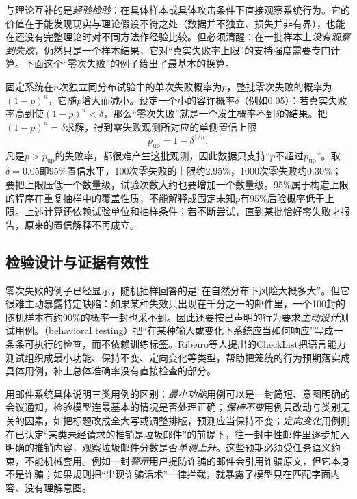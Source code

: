 与理论互补的是\emph{经验检验}：在具体样本或具体攻击条件下直接观察系统行为。它的价值在于能发现现实与理论假设不符之处（数据并不独立、损失并非有界），也能在还没有完整理论时对不同方法作经验比较。但必须清醒：在一批样本上\emph{没有观察到失败}，仍然只是一个样本结果，它对“真实失败率上限”的支持强度需要专门计算。下面这个“零次失败”的例子给出了最基本的换算。

\begin{example}[零次失败的含义]
\label{ex:trust-zero-failures}
固定系统在$n$次独立同分布试验中的单次失败概率为$p$，整批零次失败的概率为$(1-p)^n$，它随$p$增大而减小。设定一个小的容许概率$\delta$（例如0.05）：若真实失败率高到使$(1-p)^n<\delta$，那么“零次失败”就是一个发生概率不到$\delta$的结果。把$(1-p)^n=\delta$求解，得到零失败观测所对应的单侧置信上限
\[
 p_{\mathrm{up}}=1-\delta^{1/n}.
\]
凡是$p>p_{\mathrm{up}}$的失败率，都很难产生这批观测，因此数据只支持“$p$不超过$p_{\mathrm{up}}$”。取$\delta=0.05$即95\%置信水平，100次零失败的上限约2.95\%，1000次零失败约0.30\%；要把上限压低一个数量级，试验次数大约也要增加一个数量级。95\%属于构造上限的程序在重复抽样中的覆盖性质，不能解释成固定未知$p$有95\%后验概率低于上限。上述计算还依赖试验单位和抽样条件；若不断尝试，直到某批恰好零失败才报告，原来的置信解释不再成立。
\end{example}

\subsection{检验设计与证据有效性}

零次失败的例子已经显示，随机抽样回答的是“在自然分布下风险大概多大”。但它很难主动暴露特定缺陷：如果某种失效只出现在千分之一的邮件里，一个100封的随机样本有约90\%的概率一封也采不到。因此还要按已声明的行为要求\emph{主动设计}测试用例。（behavioral testing）把“在某种输入或变化下系统应当如何响应”写成一条条可执行的检查，而不依赖训练标签。Ribeiro等人提出的CheckList把语言能力测试组织成最小功能、保持不变、定向变化等类型，帮助把笼统的行为预期落实成具体用例，补上总体准确率没有直接检查的部分。

用邮件系统具体说明三类用例的区别：\emph{最小功能}用例可以是一封简短、意图明确的会议通知，检验模型连最基本的情况是否处理正确；\emph{保持不变}用例只改动与类别无关的因素，如把标题改成全大写或调整排版，预测应当保持不变；\emph{定向变化}用例则在已认定“某类未经请求的推销是垃圾邮件”的前提下，往一封中性邮件里逐步加入明确的推销内容，观察垃圾邮件分数是否\emph{单调上升}。这些预期必须受任务语义约束，不能机械套用。例如一封\emph{警示}用户提防诈骗的邮件会引用诈骗原文，但它本身不是诈骗；如果规则把“出现诈骗话术”一律拦截，就暴露了模型只在匹配字面内容、没有理解意图。

